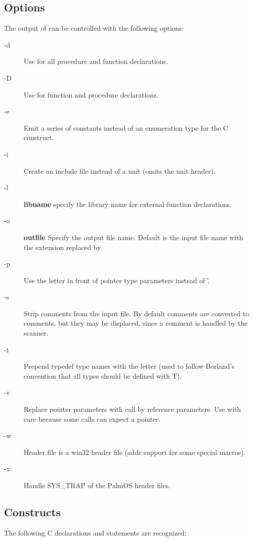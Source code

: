 \subsection{Options}
The output of   can be controlled with the following options:

\begin{description}
\item[-d] Use  for all procedure and function declarations.
\item[-D] Use  for function and 
procedure declarations.
\item[-e] Emit a series of constants instead of an enumeration type for the 
C  construct. 
\item[-i] Create an include file instead of a unit (omits the unit header).
\item[-l] \textbf{libname} specify the library name for external function 
declarations.
\item[-o] \textbf{outfile} Specify the output file name. Default is the input file name with 
the extension replaced by 
\item[-p] Use the letter  in front of pointer type parameters instead of \^.
\item[-s] Strip comments from the input file. By default comments are converted
to comments, but they may be displaced, since a comment is handled by the
scanner.
\item[-t] Prepend typedef type names with the letter  (used to follow 
Borland's convention that all types should be defined with T).
\item[-v] Replace pointer parameters with call by reference parameters.
Use with care because some calls can expect a  pointer.
\item[-w] Header file is a win32 header file (adds support for some special macros).
\item[-x] Handle SYS\_TRAP of the PalmOS header files.
\end{description}

\subsection{Constructs}
The following C declarations and statements are recognized:

